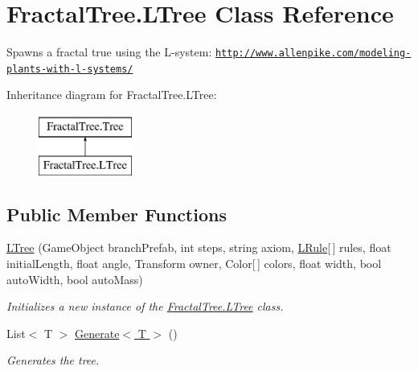 \hypertarget{class_fractal_tree_1_1_l_tree}{}\section{Fractal\+Tree.\+L\+Tree Class Reference}
\label{class_fractal_tree_1_1_l_tree}


Spawns a fractal true using the L-\/system\+: \href{http://www.allenpike.com/modeling-plants-with-l-systems/}{\tt http\+://www.\+allenpike.\+com/modeling-\/plants-\/with-\/l-\/systems/}  


Inheritance diagram for Fractal\+Tree.\+L\+Tree\+:\begin{figure}[H]
\begin{center}
\leavevmode
\includegraphics[height=2.000000cm]{class_fractal_tree_1_1_l_tree}
\end{center}
\end{figure}
\subsection*{Public Member Functions}
\begin{DoxyCompactItemize}
\item 
\hyperlink{class_fractal_tree_1_1_l_tree_aa8fd4aff64da19419567e96b74d7c229}{L\+Tree} (Game\+Object branch\+Prefab, int steps, string axiom, \hyperlink{class_fractal_tree_1_1_l_rule}{L\+Rule}\mbox{[}$\,$\mbox{]} rules, float initial\+Length, float angle, Transform owner, Color\mbox{[}$\,$\mbox{]} colors, float width, bool auto\+Width, bool auto\+Mass)
\begin{DoxyCompactList}\small\item\em Initializes a new instance of the \hyperlink{class_fractal_tree_1_1_l_tree}{Fractal\+Tree.\+L\+Tree} class. \end{DoxyCompactList}\item 
List$<$ T $>$ \hyperlink{class_fractal_tree_1_1_l_tree_a36b2a48dbb01982a649f8949823464fc}{Generate$<$ T $>$} ()
\begin{DoxyCompactList}\small\item\em Generates the tree. \end{DoxyCompactList}\end{DoxyCompactItemize}


